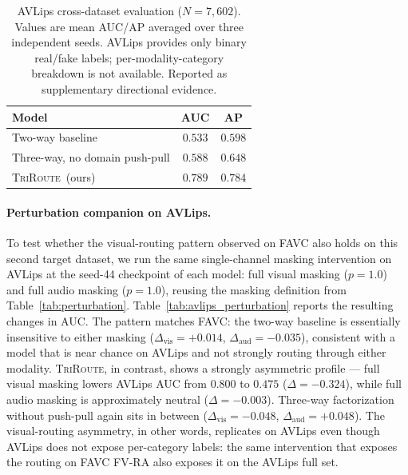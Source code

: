 \documentclass{article}
\newcommand{\method}{\textsc{TriRoute}}
\begin{document}
\begin{table}[t]
    \centering
    \caption{AVLips cross-dataset evaluation ($N=7{,}602$). Values are mean AUC/AP averaged over three independent seeds. AVLips provides only binary real/fake labels; per-modality-category breakdown is not available. Reported as supplementary directional evidence.}
    \label{tab:avlips}
    \small
    \begin{tabular}{lcc}
        \toprule
        Model & AUC & AP \\
        \midrule
        Two-way baseline        & $0.533$ & $0.598$ \\
        Three-way, no domain push-pull & $0.588$ & $0.648$ \\
        \method\ (ours)         & $\mathbf{0.789}$ & $\mathbf{0.784}$ \\
        \bottomrule
    \end{tabular}
\end{table}

\paragraph{Perturbation companion on AVLips.}
To test whether the visual-routing pattern observed on FAVC also holds on this second target dataset, we run the same single-channel masking intervention on AVLips at the seed-44 checkpoint of each model: full visual masking ($p=1.0$) and full audio masking ($p=1.0$), reusing the masking definition from Table~\ref{tab:perturbation}. Table~\ref{tab:avlips_perturbation} reports the resulting changes in AUC. The pattern matches FAVC: the two-way baseline is essentially insensitive to either masking ($\Delta_\mathrm{vis}=+0.014$, $\Delta_\mathrm{aud}=-0.035$), consistent with a model that is near chance on AVLips and not strongly routing through either modality. \method, in contrast, shows a strongly asymmetric profile --- full visual masking lowers AVLips AUC from $0.800$ to $0.475$ ($\Delta=-0.324$), while full audio masking is approximately neutral ($\Delta=-0.003$). Three-way factorization without push-pull again sits in between ($\Delta_\mathrm{vis}=-0.048$, $\Delta_\mathrm{aud}=+0.048$). The visual-routing asymmetry, in other words, replicates on AVLips even though AVLips does not expose per-category labels: the same intervention that exposes the routing on FAVC FV-RA also exposes it on the AVLips full set.
\end{document}

